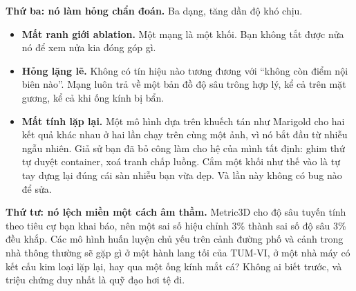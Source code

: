 \documentclass[../../deep_learning.tex]{subfiles}
\begin{document}
\textbf{Thứ ba: nó làm hỏng chẩn đoán.} Ba dạng, tăng dần độ khó chịu.
\begin{itemize}
\item \textbf{Mất ranh giới ablation.} Một mạng là một khối. Bạn không tắt được nửa nó để xem nửa kia đóng góp gì.
\item \textbf{Hỏng lặng lẽ.} Không có tín hiệu nào tương đương với ``không còn điểm nội biên nào''. Mạng luôn trả về một bản đồ độ sâu trông hợp lý, kể cả trên mặt gương, kể cả khi ống kính bị bẩn.
\item \textbf{Mất tính lặp lại.} Một mô hình dựa trên khuếch tán như Marigold cho hai kết quả khác nhau ở hai lần chạy trên cùng một ảnh, vì nó bắt đầu từ nhiễu ngẫu nhiên. Giả sử bạn đã bỏ công làm cho hệ của mình tất định: ghim thứ tự duyệt container, xoá tranh chấp luồng. Cắm một khối như thế vào là tự tay dựng lại đúng cái sàn nhiễu bạn vừa dẹp. Và lần này không có bug nào để sửa.
\end{itemize}

\textbf{Thứ tư: nó lệch miền một cách âm thầm.} Metric3D cho độ sâu tuyến tính theo tiêu cự bạn khai báo, nên một sai số hiệu chỉnh 3\% thành sai số độ sâu 3\% đều khắp. Các mô hình huấn luyện chủ yếu trên cảnh đường phố và cảnh trong nhà thông thường sẽ gặp gì ở một hành lang tối của TUM-VI, ở một nhà máy có kết cấu kim loại lặp lại, hay qua một ống kính mắt cá? Không ai biết trước, và triệu chứng duy nhất là quỹ đạo hơi tệ đi.
\end{document}
